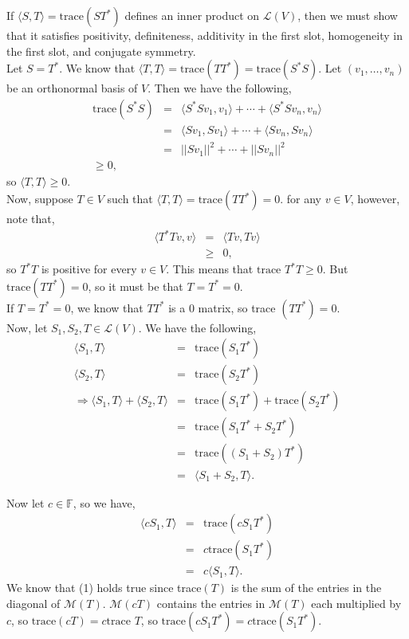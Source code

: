 \documentclass[12pt]{article}
\newcommand{\problem}[1]{\vspace{0.3in} \noindent {\bf Problem #1}}
\begin{document}
\problem{3} If $\langle S, T \rangle = \text{trace}(ST^*)$ defines an inner product on $\mathcal{L}(V)$, then we must show that it satisfies positivity, definiteness, additivity in the first slot, homogeneity in the first slot, and conjugate symmetry.\\

\noindent
Let $S = T^*$. We know that $\langle T, T \rangle = \text{trace}(TT^*) = \text{trace}(S^*S)$. Let $(v_1, \ldots, v_n)$ be an orthonormal basis of $V$. Then we have the following,
\begin{eqnarray*}
\text{trace}(S^*S) &=& \langle S^*Sv_1, v_1 \rangle + \cdots + \langle S^*Sv_n, v_n \rangle\\
&=& \langle Sv_1, Sv_1 \rangle + \cdots + \langle Sv_n, Sv_n \rangle\\
&=& ||Sv_1||^2 + \cdots + ||Sv_n||^2\\
\ge 0,
\end{eqnarray*}
so $\langle T, T \rangle \ge 0$. \\

\noindent
Now, suppose $T \in V$ such that $\langle T, T \rangle = \text{trace}(TT^*) =0$. for any $v \in V$, however, note that,
\begin{eqnarray*}
\langle T^*Tv, v \rangle &=& \langle Tv, Tv \rangle\\
&\ge& 0,
\end{eqnarray*}
so $T^*T$ is positive for every $v \in V$. This means that $\text{trace }T^*T \ge 0$. But $\text{trace}(TT^*) =0$, so it must be that $T = T^* = 0$. \\

\noindent
If $T = T^* = 0$, we know that $TT^*$ is a 0 matrix, so trace $(TT^*) = 0$. \\

\noindent
 Now, let $S_1, S_2, T \in \mathcal{L}(V)$. We have the following,
 \begin{eqnarray*}
 \langle S_1, T \rangle &=& \text{trace}(S_1T^*)\\
 \langle S_2, T \rangle &=& \text{trace}(S_2T^*)\\
 \Longrightarrow \langle S_1, T \rangle + \langle S_2, T \rangle &=& \text{trace}(S_1T^*) +  \text{trace}(S_2T^*)\\
 &=& \text{trace}(S_1T^* + S_2T^*)\\
 &=& \text{trace}((S_1 + S_2)T^*)\\
 &=& \langle S_1 + S_2, T \rangle.
 \end{eqnarray*} 

 
 \noindent
 Now let $c \in \mathbb{F}$, so we have,
 \begin{eqnarray}
 \langle cS_1, T \rangle &=& \text{trace}(cS_1T^*) \nonumber \\
 &=& c \text{trace}(S_1T^*)  \\
 &=& c \langle S_1, T \rangle. \nonumber
 \end{eqnarray}
We know that (1) holds true since trace$(T)$ is the sum of the entries in the diagonal of $\mathcal{M}(T)$. $\mathcal{M}(cT)$ contains the entries in $\mathcal{M}(T)$ each multiplied by $c$, so $\text{trace}(cT) = c\text{trace }T$, so $\text{trace}(cS_1T^*) = c \text{trace}(S_1T^*) $.\\
\end{document}
